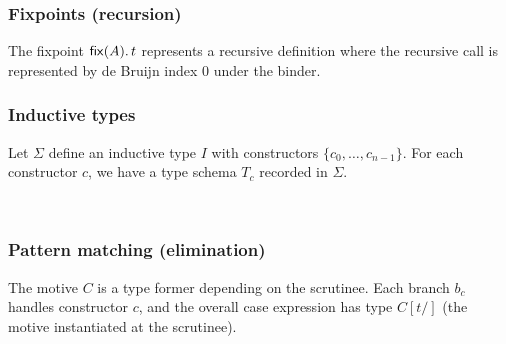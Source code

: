 \subsubsection{Fixpoints (recursion)}

\begin{Rules}
\end{Rules}

\noindent The fixpoint $\mathsf{fix}(A).\,t$ represents a recursive definition where the recursive call is represented by de Bruijn index 0 under the binder.

\subsubsection{Inductive types}

Let $\Sigma$ define an inductive type $I$ with constructors $\{c_0, \ldots, c_{n-1}\}$. For each constructor $c$, we have a type schema $T_c$ recorded in $\Sigma$.

\begin{Rules}
\\[1.5em]
\end{Rules}

\subsubsection{Pattern matching (elimination)}

\begin{Rules}
\end{Rules}

\noindent The motive $C$ is a type former depending on the scrutinee. Each branch $b_c$ handles constructor $c$, and the overall case expression has type $C[t/]$ (the motive instantiated at the scrutinee).

